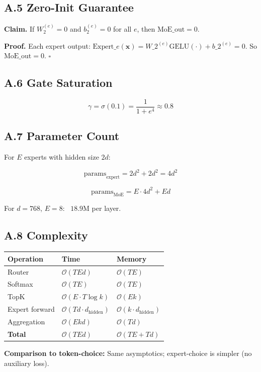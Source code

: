 \subsection{A.5 Zero-Init Guarantee}

\textbf{Claim.} If $W_2^{(e)} = 0$ and $b_2^{(e)} = 0$ for all $e$, then 
$\text{MoE\_out} = 0$.

\textbf{Proof.} Each expert output: $\text{Expert}\_e(\mathbf{x}) = W\_2^{(e)} 
\text{GELU}(\cdot) + b\_2^{(e)} = 0$. So $\text{MoE\_out} = 0$. $\square$

\subsection{A.6 Gate Saturation}

\[
\gamma = \sigma(0.1) = \frac{1}{1 + e^{4}} \approx 0.8
\tag{A.7}
\]

\subsection{A.7 Parameter Count}

For $E$ experts with hidden size $2d$:

\[
\text{params}_\text{expert} = 2 d^2 + 2 d^2 = 4 d^2
\tag{A.8}
\]

\[
\text{params}_\text{MoE} = E \cdot 4 d^2 + E d
\tag{A.9}
\]

For $d = 768$, $E = 8$: ~$18.9$M per layer.

\subsection{A.8 Complexity}

\begin{table}[H]
\centering
\small
\begin{tabular}{lll}
\toprule
\textbf{Operation} & \textbf{Time} & \textbf{Memory} \\
\midrule
Router & $\mathcal{O}(T E d)$ & $\mathcal{O}(T E)$ \\
Softmax & $\mathcal{O}(T E)$ & $\mathcal{O}(T E)$ \\
TopK & $\mathcal{O}(E \cdot T \log k)$ & $\mathcal{O}(E k)$ \\
Expert forward & $\mathcal{O}(T d \cdot d_\text{hidden})$ & $\mathcal{O}(k \cdot d_\text{hidden})$ \\
Aggregation & $\mathcal{O}(E k d)$ & $\mathcal{O}(T d)$ \\
\textbf{Total} & $\mathcal{O}(T E d)$ & $\mathcal{O}(T E + T d)$ \\
\bottomrule
\end{tabular}
\end{table}

\textbf{Comparison to token-choice:} Same asymptotics; expert-choice is simpler 
(no auxiliary loss).

